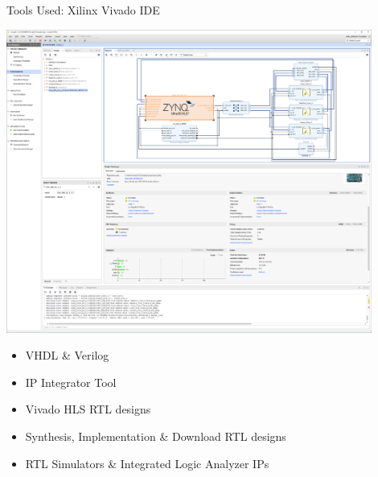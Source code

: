 \begin{frame}{Tools Used: Xilinx Vivado IDE}
	\begin{minipage}{0.6\textwidth}
		\centering
		\includegraphics[width=0.9\textwidth]{../Images/Platform/Vivado-IDE.png}\\
	\end{minipage}%
	\begin{minipage}{0.4\textwidth}
		\begin{itemize}
			\item VHDL \& Verilog
			\item IP Integrator Tool
			\item Vivado HLS RTL designs
			\item Synthesis, Implementation \& Download RTL designs
			\item RTL Simulators \& Integrated Logic Analyzer IPs
		\end{itemize}
	\end{minipage}
\end{frame}

